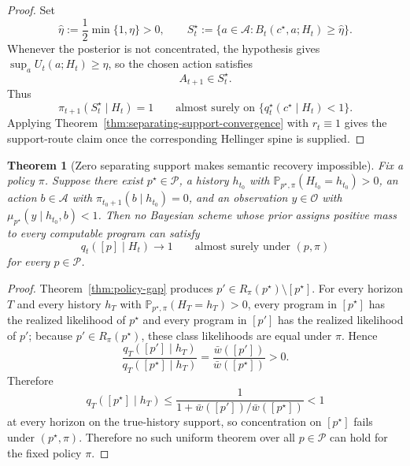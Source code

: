 \documentclass[11pt]{article}
\newtheorem{theorem}{Theorem}[section]
\theoremstyle{definition}
\theoremstyle{remark}
\newcommand{\Acal}{\mathcal{A}}
\newcommand{\Ocal}{\mathcal{O}}
\newcommand{\Pcal}{\mathcal{P}}
\newcommand{\Prob}{\mathbb{P}}
\begin{document}
\begin{proof}
Set
\[
\hat\eta:=\frac{1}{2}\min\{1,\eta\}>0,
\qquad
S_t^\star:=\{a\in\Acal:B_t(c^\star,a;H_t)\ge \hat\eta\}.
\]
Whenever the posterior is not concentrated, the hypothesis gives $\sup_a U_t(a;H_t)\ge\eta$, so the chosen action satisfies
\[
A_{t+1}\in S_t^\star.
\]
Thus
\[
\pi_{t+1}(S_t^\star\mid H_t)=1
\qquad\text{almost surely on }\{q_t^\star(c^\star\mid H_t)<1\}.
\]
Applying Theorem~\ref{thm:separating-support-convergence} with $r_t\equiv 1$ gives the support-route claim once the corresponding Hellinger spine is supplied.
\end{proof}

\begin{theorem}[Zero separating support makes semantic recovery impossible]
\label{cor:support-necessary}
Fix a policy $\pi$. Suppose there exist $p^\star\in\Pcal$, a history $h_{t_0}$ with $\Prob_{p^\star,\pi}(H_{t_0}=h_{t_0})>0$, an action $b\in\Acal$ with $\pi_{t_0+1}(b\mid h_{t_0})=0$, and an observation $y\in\Ocal$ with $\mu_{p^\star}(y\mid h_{t_0},b)<1$. Then no Bayesian scheme whose prior assigns positive mass to every computable program can satisfy
\[
q_t([p]\mid H_t)\longrightarrow 1
\qquad\text{almost surely under }(p,\pi)
\]
for every $p\in\Pcal$.
\end{theorem}

\begin{proof}
Theorem~\ref{thm:policy-gap} produces $p'\in R_\pi(p^\star)\setminus[p^\star]$. For every horizon $T$ and every history $h_T$ with $\Prob_{p^\star,\pi}(H_T=h_T)>0$, every program in $[p^\star]$ has the realized likelihood of $p^\star$ and every program in $[p']$ has the realized likelihood of $p'$; because $p'\in R_\pi(p^\star)$, these class likelihoods are equal under $\pi$. Hence
\[
\frac{q_T([p']\mid h_T)}{q_T([p^\star]\mid h_T)}
=
\frac{\bar w([p'])}{\bar w([p^\star])}
>0.
\]
Therefore
\[
q_T([p^\star]\mid h_T)\le \frac{1}{1+\bar w([p'])/\bar w([p^\star])}<1
\]
at every horizon on the true-history support, so concentration on $[p^\star]$ fails under $(p^\star,\pi)$. Therefore no such uniform theorem over all $p\in\Pcal$ can hold for the fixed policy $\pi$.
\end{proof}
\end{document}
